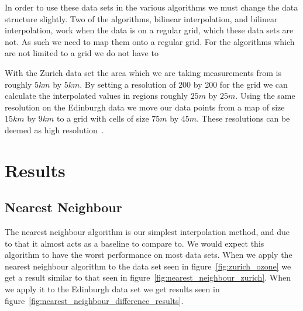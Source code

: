 			In order to use these data sets in the various algorithms we must change the data structure slightly. Two of the algorithms, bilinear interpolation, and bilinear interpolation, work when the data is on a regular grid, which these data sets are not. As such we need to map them onto a regular grid. For the algorithms which are not limited to a grid we do not have to

			With the Zurich data set the area which we are taking measurements from is roughly $5km$ by $5km$. By setting a resolution of 200 by 200 for the grid we can calculate the interpolated values in regions roughly $25m$ by $25m$. Using the same resolution on the Edinburgh data we move our data points from a map of size $15km$ by $9km$ to a grid with cells of size $75m$ by $45m$. These resolutions can be deemed as high resolution~\cite{spatiotemporalresolution}.


    \section{Results}\label{prediction_evaluation_results}

        \subsection{Nearest Neighbour}\label{prediction_evaluation_results_nearest_neighbour}


	        The nearest neighbour algorithm is our simplest interpolation method, and due to that it almost acts as a baseline to compare to. We would expect this algorithm to have the worst performance on most data sets. When we apply the nearest neighbour algorithm to the data set seen in figure~\ref{fig:zurich_ozone} we get a result similar to that seen in figure~\ref{fig:nearest_neighbour_zurich}. When we apply it to the Edinburgh data set we get results seen in figure~\ref{fig:nearest_neighbour_difference_results}. 


